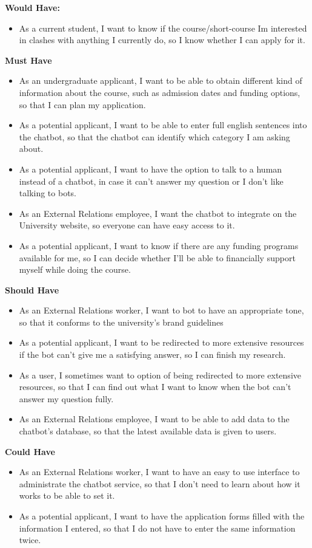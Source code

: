 \documentclass{l3proj}
\begin{document}
\textbf{Would Have:}
\begin{itemize}
\item As a current student, I want to know if the course/short-course I\textsc{}m interested in clashes with anything I currently do, so I know whether I can apply for it.
\end{itemize}

\iffalse
\textbf{Must Have}
\begin{itemize}
\item As an undergraduate applicant, I want to be able to obtain different kind of information about the course, such as admission dates and funding options, so that I can plan my application.
\item As a potential applicant, I want to be able to enter full english sentences into the chatbot, so that the chatbot can identify which category I am asking about.
\item As a potential applicant, I want to have the option to talk to a human instead of a chatbot, in case it can’t answer my question or I don’t like talking to bots.
\item As an External Relations employee, I want the chatbot to integrate on the University website, so everyone can have easy access to it.
\item As a potential applicant, I want to know if there are any funding programs available for me, so I can decide whether I’ll be able to financially support myself while doing the course.
\end{itemize}

\textbf{Should Have}
\begin{itemize}
\item As an External Relations worker, I want to bot to have an appropriate tone, so that it conforms to the university’s brand guidelines
\item As a potential applicant, I want to be redirected to more extensive resources if the bot can’t give me a satisfying answer, so I can finish my research.
\item As a user, I sometimes want to option of being redirected to more extensive resources, so that I can find out what I want to know when the bot can’t answer my question fully.
\item As an External Relations employee, I want to be able to add data to the chatbot’s database, so that the latest available data is given to users.
\end{itemize}

\textbf{Could Have}
\begin{itemize}
\item As an External Relations worker, I want to have an easy to use interface to administrate the chatbot service, so that I don’t need to learn about how it works to be able to set it.
\item As a potential applicant, I want to have the application forms filled with the information I entered, so that I do not have to enter the same information twice.
\end{itemize}
\end{document}
